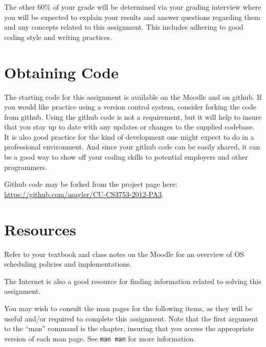 \documentclass[12pt]{article}
\begin{document}
The other 60\% of your grade will be determined via your grading
interview where you will be expected to explain your results and answer
questions regarding them and any concepts related to this assignment.
This includes adhering to good coding style and writing practices.

\section{Obtaining Code}
The starting code for this assignment is available on the Moodle and
on github. If you would like practice using a version control system,
consider forking the code from github. Using the github code is not
a requirement, but it will help to insure that you stay up to date
with any updates or changes to the supplied codebase. It is also
good practice for the kind of development one might expect to do in
a professional environment. And since your github code can be easily
shared, it can be a good way to show off your coding skills to
potential employers and other programmers.

Github code may be forked from the project page here:\\
\url{https://github.com/asayler/CU-CS3753-2012-PA3}.

\section{Resources}
Refer to your textbook and class notes on the Moodle for an overview
of OS scheduling policies and implementations.

The Internet\cite{tubes} is also a good resource for finding
information related to solving this assignment.

You may wish to consult the man pages for the following items, as they
will be useful and/or required to complete this assignment. Note that
the first argument to the ``man'' command is the chapter, insuring
that you access the appropriate version of each man page. See
\texttt{man man} for more information.
\end{document}
